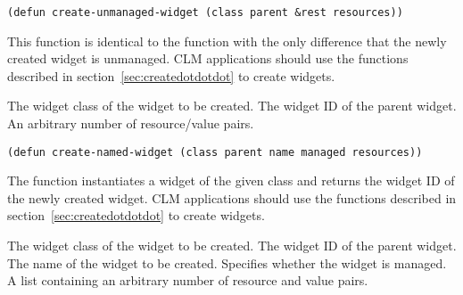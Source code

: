 \begin{lispd}
\syntax\begin{verbatim}
(defun create-unmanaged-widget (class parent &rest resources))
\end{verbatim}
\beschr
This function is identical to the  function with the only
difference that the newly created widget is unmanaged.
\hinweis CLM applications should use the  functions described
in section~\ref{sec:createdotdotdot} to create widgets.
\parameter
\begin{paramd}
 The widget class of the widget to be created.
 The widget ID of the parent widget.
 An arbitrary number of resource/value pairs.
\end{paramd}
\end{lispd}

\begin{lispd}
\syntax\begin{verbatim}
(defun create-named-widget (class parent name managed resources))
\end{verbatim}
\beschr The function instantiates a widget of the given class and
returns the widget ID of the newly created widget.
\hinweis CLM applications should use the  functions described
in section~\ref{sec:createdotdotdot} to create widgets.
\parameter
\begin{paramd}
 The widget class of the widget to be created.
 The widget ID of the parent widget.
 The name of the widget to be created.
 Specifies whether the widget is managed.
 A list containing an arbitrary number of resource and value 
pairs.
\end{paramd}
\end{lispd}
\pagebreak


